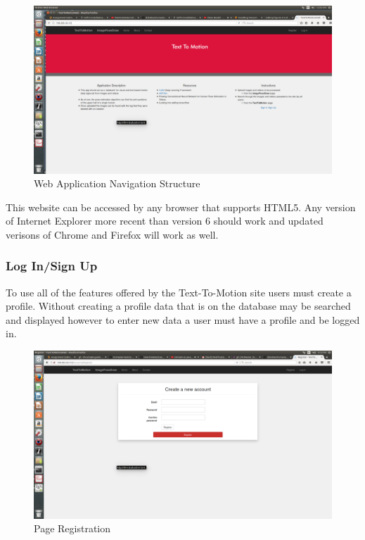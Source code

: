 \documentclass{scrreprt}
\begin{document}
\begin{figure}
  \includegraphics[width=\linewidth]{HomePage.png}
  \caption{Web Application Navigation Structure}
  \label{fig:homePage}
\end{figure}

This website can be accessed by any browser that supports HTML5.  Any
version of Internet Explorer more recent than version 6 should work and updated
verisons of Chrome and Firefox will work as well.

\subsubsection{Log In/Sign Up}

To use all of the features offered by the Text-To-Motion site users must create
a profile.  Without creating a profile data that is on the database may be
searched and displayed however to enter new data a user must have a profile and
be logged in.

\begin{figure}
  \includegraphics[width=\linewidth]{Register.png}
  \caption{Page Registration}
  \label{fig:regPage}
\end{figure}
\end{document}

